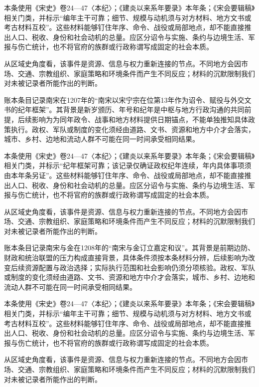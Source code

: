 本条使用《宋史》卷24—47〈本纪〉；《建炎以来系年要录》本年条；《宋会要辑稿》相关门类，并标示“编年主干可靠；细节、规模与动机须与对方材料、地方文书或考古材料互校”。这些材料能够钉住年序、命令、战役或局部地点，却不能直接推出人口、税收、身份和社会动机的总量。应区分诏令与实施、条约与边境生活、军报与伤亡统计，也不将官府的族群或行政称谓写成固定的社会本质。

从区域史角度看，该事件是资源、信息与权力重新连接的节点。不同地方会因市场、交通、宗教组织、家庭策略和环境条件而产生不同反应；材料的沉默限制我们对未被记录者所能作出的判断。

账本条目记录南宋在1207年的“南宋以宋宁宗在位第13年作为诏令、赋役与外交文书的纪年框架”。其背景是新岁颁历、年号和纪年是中枢与地方行政沟通的共同前提，后续影响为为同年政令、战事和地方材料提供日期锚点，不能单独推知具体政策执行。政权、军队或制度的变化须经由道路、文书、资源和地方中介才会落实，城市、乡村、边地和流动人群不可能在同一时间承受相同结果。

本条使用《宋史》卷24—47〈本纪〉；《建炎以来系年要录》本年条；《宋会要辑稿》相关门类，并标示“纪年框架可靠；该记录仅确证政权纪年连续，年内具体事项须由本年条另证”。这些材料能够钉住年序、命令、战役或局部地点，却不能直接推出人口、税收、身份和社会动机的总量。应区分诏令与实施、条约与边境生活、军报与伤亡统计，也不将官府的族群或行政称谓写成固定的社会本质。

从区域史角度看，该事件是资源、信息与权力重新连接的节点。不同地方会因市场、交通、宗教组织、家庭策略和环境条件而产生不同反应；材料的沉默限制我们对未被记录者所能作出的判断。

账本条目记录南宋与金在1208年的“南宋与金订立嘉定和议”。其背景是前期边防、财政和统治联盟的压力构成直接背景，具体条件须按本条材料分辨，后续影响为改变后续资源配置与政治选择；实际执行范围和社会影响仍须分项核验。政权、军队或制度的变化须经由道路、文书、资源和地方中介才会落实，城市、乡村、边地和流动人群不可能在同一时间承受相同结果。

本条使用《宋史》卷24—47〈本纪〉；《建炎以来系年要录》本年条；《宋会要辑稿》相关门类，并标示“编年主干可靠；细节、规模与动机须与对方材料、地方文书或考古材料互校”。这些材料能够钉住年序、命令、战役或局部地点，却不能直接推出人口、税收、身份和社会动机的总量。应区分诏令与实施、条约与边境生活、军报与伤亡统计，也不将官府的族群或行政称谓写成固定的社会本质。

从区域史角度看，该事件是资源、信息与权力重新连接的节点。不同地方会因市场、交通、宗教组织、家庭策略和环境条件而产生不同反应；材料的沉默限制我们对未被记录者所能作出的判断。

